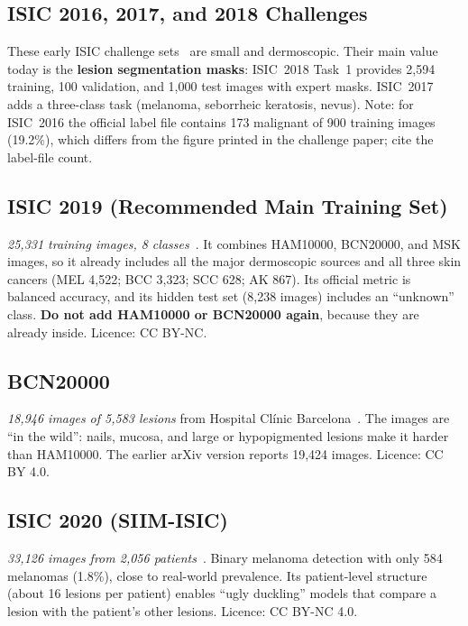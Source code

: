 \documentclass[10pt,a4paper]{article}
\begin{document}
\subsection{ISIC 2016, 2017, and 2018 Challenges}
These early ISIC challenge sets~\cite{gutman2016isic,codella2018isic2017,codella2019isic2018}
are small and dermoscopic. Their main value today is the
\textbf{lesion segmentation masks}: ISIC~2018 Task~1 provides 2{,}594
training, 100 validation, and 1{,}000 test images with expert masks.
ISIC~2017 adds a three-class task (melanoma, seborrheic keratosis,
nevus). Note: for ISIC~2016 the official label file contains 173
malignant of 900 training images (19.2\%), which differs from the
figure printed in the challenge paper; cite the label-file count.

\subsection{ISIC 2019 (Recommended Main Training Set)}
\emph{25{,}331 training images, 8 classes}~\cite{gessert2020}. It
combines HAM10000, BCN20000, and MSK images, so it already includes all
the major dermoscopic sources and all three skin cancers (MEL 4{,}522;
BCC 3{,}323; SCC 628; AK 867). Its official metric is balanced
accuracy, and its hidden test set (8{,}238 images) includes an
``unknown'' class. \textbf{Do not add HAM10000 or BCN20000 again}, because
they are already inside. Licence: CC BY-NC.

\subsection{BCN20000}
\emph{18{,}946 images of 5{,}583 lesions} from Hospital Cl\'inic
Barcelona~\cite{hernandez2024bcn20000,combalia2019bcn20000}. The
images are ``in the wild'': nails, mucosa, and large or hypopigmented
lesions make it harder than HAM10000. The earlier arXiv version reports
19{,}424 images. Licence: CC BY 4.0.

\subsection{ISIC 2020 (SIIM-ISIC)}
\emph{33{,}126 images from 2{,}056 patients}~\cite{rotemberg2021isic2020}.
Binary melanoma detection with only 584 melanomas (1.8\%), close to
real-world prevalence. Its patient-level structure (about 16 lesions per
patient) enables ``ugly duckling'' models that compare a lesion with
the patient's other lesions. Licence: CC BY-NC 4.0.
\end{document}
